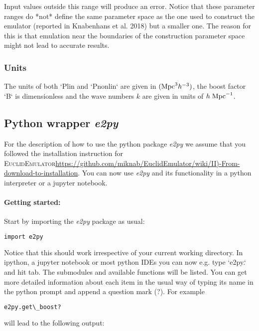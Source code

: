 \documentclass[american,11pt]{article}
\begin{document}
Input values outside this range will produce an error. Notice that these parameter ranges do *not* define the same parameter space as the one used to construct the emulator (reported in Knabenhans et al. 2018) but a smaller one. The reason for this is that emulation near the boundaries of the construction parameter space might not lead to accurate results.

\subsubsection{Units}
The units of both `Plin and `Pnonlin` are given in $({\rm Mpc}^3h^{-3})$, the boost factor `B` is dimensionless and the wave numbers $k$ are given in units of $h\;{\rm Mpc}^{-1}$.

\subsection{Python wrapper \textit{e2py}}
For the description of how to use the python package \textit{e2py} we assume that you followed the installation instruction for \textsc{EuclidEmulator}\url{https://github.com/miknab/EuclidEmulator/wiki/II)-From-download-to-installation}. You can now use \textit{e2py} and its functionality in a python interpreter or a jupyter notebook.

\paragraph{Getting started:}
Start by importing the \textit{e2py} package as usual:
\begin{lstlisting}[language=bash]
   import e2py
\end{lstlisting}
Notice that this should work irrespective of your current working directory. In ipython, a jupyter notebook or most python IDEs you can now e.g. type `e2py.` and hit tab. The submodules and available functions will be listed. You can get more detailed information about each item in the usual way of typing its name in the python prompt and append a question mark (?). For example

\begin{lstlisting}[language=python]
      e2py.get\_boost?
\end{lstlisting}

will lead to the following output:
\end{document}
